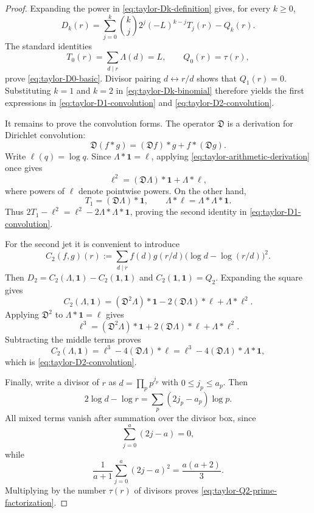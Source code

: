 \begin{proof}
Expanding the power in \eqref{eq:taylor-Dk-definition} gives, for every
$k\geq0$,
\begin{equation}
 D_k(r)
 =\sum_{j=0}^k\binom{k}{j}2^j(-L)^{k-j}T_j(r)-Q_k(r).
 \label{eq:taylor-Dk-binomial}
\end{equation}
The standard identities
\[
 T_0(r)=\sum_{d\mid r}\Lambda(d)=L,
 \qquad Q_0(r)=\tau(r),
\]
prove \eqref{eq:taylor-D0-basic}.  Divisor pairing
$d\leftrightarrow r/d$ shows that $Q_1(r)=0$.  Substituting $k=1$ and
$k=2$ in \eqref{eq:taylor-Dk-binomial} therefore yields the first
expressions in \eqref{eq:taylor-D1-convolution} and
\eqref{eq:taylor-D2-convolution}.

It remains to prove the convolution forms.  The operator $\mathfrak D$ is
a derivation for Dirichlet convolution:
\begin{equation}
 \mathfrak D(f*g)=(\mathfrak Df)*g+f*(\mathfrak Dg).
 \label{eq:taylor-arithmetic-derivation}
\end{equation}
Write $\ell(q)=\log q$.  Since
$\Lambda*\mathbf 1=\ell$, applying \eqref{eq:taylor-arithmetic-derivation}
once gives
\[
 \ell^2=(\mathfrak D\Lambda)*\mathbf 1
          +\Lambda*\ell,
\]
where powers of $\ell$ denote pointwise powers.  On the other hand,
\[
 T_1=(\mathfrak D\Lambda)*\mathbf 1,
 \qquad
 \Lambda*\ell=\Lambda*\Lambda*\mathbf 1.
\]
Thus $2T_1-\ell^2=\ell^2-2\Lambda*\Lambda*\mathbf 1$, proving the
second identity in \eqref{eq:taylor-D1-convolution}.

For the second jet it is convenient to introduce
\[
 C_2(f,g)(r)
 :=\sum_{d\mid r}f(d)g(r/d)
       \bigl(\log d-\log(r/d)\bigr)^2.
\]
Then $D_2=C_2(\Lambda,\mathbf 1)-C_2(\mathbf 1,\mathbf 1)$ and
$C_2(\mathbf 1,\mathbf 1)=Q_2$.  Expanding the square gives
\[
 C_2(\Lambda,\mathbf 1)
 = (\mathfrak D^2\Lambda)*\mathbf 1
   -2(\mathfrak D\Lambda)*\ell
   +\Lambda*\ell^2.
\]
Applying $\mathfrak D^2$ to $\Lambda*\mathbf 1=\ell$ gives
\[
 \ell^3
 = (\mathfrak D^2\Lambda)*\mathbf 1
   +2(\mathfrak D\Lambda)*\ell
   +\Lambda*\ell^2.
\]
Subtracting the middle terms proves
\[
 C_2(\Lambda,\mathbf 1)
 =\ell^3-4(\mathfrak D\Lambda)*\ell
 =\ell^3-4(\mathfrak D\Lambda)*\Lambda*\mathbf 1,
\]
which is \eqref{eq:taylor-D2-convolution}.

Finally, write a divisor of $r$ as $d=\prod_p p^{j_p}$ with
$0\leq j_p\leq a_p$.  Then
\[
 2\log d-\log r
 =\sum_p(2j_p-a_p)\log p.
\]
All mixed terms vanish after summation over the divisor box, since
\[
 \sum_{j=0}^a(2j-a)=0,
\]
while
\[
 \frac1{a+1}\sum_{j=0}^a(2j-a)^2=\frac{a(a+2)}3.
\]
Multiplying by the number $\tau(r)$ of divisors proves
\eqref{eq:taylor-Q2-prime-factorization}.
\end{proof}


